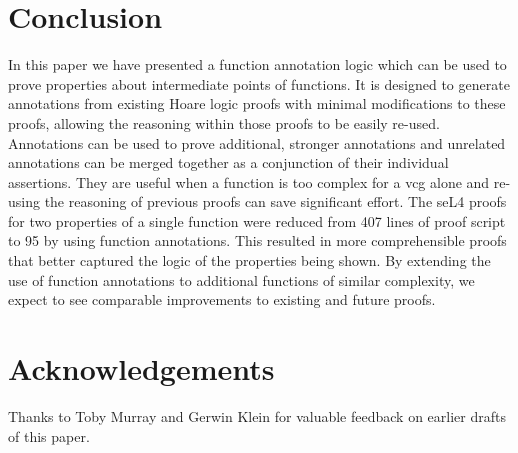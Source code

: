 \documentclass[submission]{eptcs}
\begin{document}
\section{Conclusion}
In this paper we have presented a function annotation logic
which can be used to prove properties about intermediate
points of functions. It is designed to generate 
annotations from existing Hoare logic proofs with minimal 
modifications to these proofs, allowing the reasoning
within those proofs to be easily re-used.
Annotations can be used to prove additional,
stronger annotations and unrelated annotations can be merged
together as a conjunction of their individual assertions. They
are useful when a function is too complex for a vcg alone and re-using
the reasoning of previous proofs can save significant effort.
The seL4 proofs for two properties of a single function were reduced from 407 lines of proof script to 95 by using function annotations. This resulted in more comprehensible
proofs that better captured the logic of the properties being shown. By extending the use of function annotations to additional
functions of similar complexity, we expect to see comparable
improvements to existing and future proofs.

\section*{Acknowledgements}
Thanks to Toby Murray and Gerwin Klein for valuable
feedback on earlier drafts of this paper.



\end{document}
